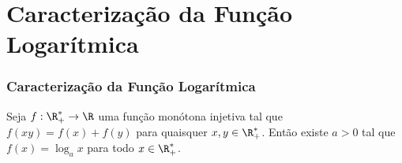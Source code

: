 \section{Caracterização da Função Logarítmica}
\begin{frame}
\frametitle{Caracterização da Função Logarítmica} 

\begin{teorema}
Seja $f:  \R_+^\ast \to \R$ uma função monótona injetiva tal que
$f(xy) = f(x) + f(y)$ para quaisquer $x, y \in \R_+^\ast$. Então
existe $a>0$ tal que $f(x) = \log_a x$ para todo $x \in \R_+^\ast$.
\end{teorema}



\end{frame}


